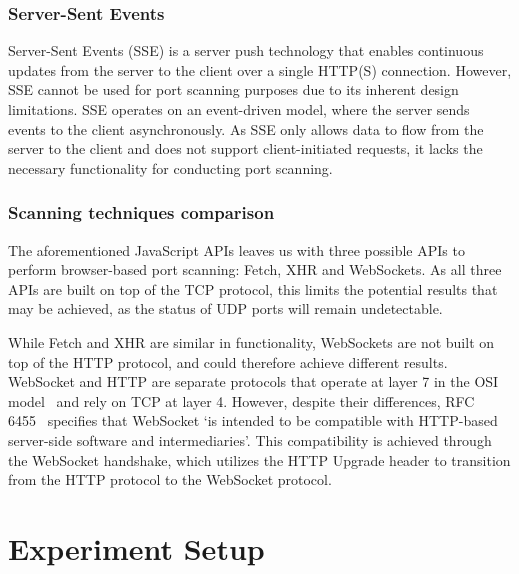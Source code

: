 \subsubsection{Server-Sent Events}

Server-Sent Events (SSE) is a server push technology that enables continuous updates from the server to the client over a single HTTP(S) connection. However, SSE cannot be used for port scanning purposes due to its inherent design limitations. SSE operates on an event-driven model, where the server sends events to the client asynchronously. As SSE only allows data to flow from the server to the client and does not support client-initiated requests, it lacks the necessary functionality for conducting port scanning.

\subsubsection{Scanning techniques comparison}

The aforementioned JavaScript APIs leaves us with three possible APIs to perform browser-based port scanning: Fetch, XHR and WebSockets. As all three APIs are built on top of the TCP protocol, this limits the potential results that may be achieved, as the status of UDP ports will remain undetectable. 

While Fetch and XHR are similar in functionality, WebSockets are not built on top of the HTTP protocol, and could therefore achieve different results. WebSocket and HTTP are separate protocols that operate at layer 7 in the OSI model~ and rely on TCP at layer 4. However, despite their differences, RFC 6455~ specifies that WebSocket `is intended to be compatible with HTTP-based server-side software and intermediaries'. This compatibility is achieved through the WebSocket handshake, which utilizes the HTTP Upgrade header to transition from the HTTP protocol to the WebSocket protocol.

\section{Experiment Setup}

